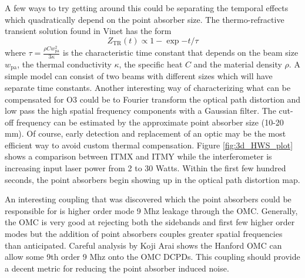 	A few ways to try getting around this could be separating the temporal effects which quadratically depend on the point absorber size. The thermo-refractive transient solution found in Vinet \cite{Vinet_Thermal_Issues} has the form
	\begin{equation}\label{Thermal_Dist_time}
	Z_{\text{TR}}(t)   \propto 1-\exp{-t/ \tau}
	\end{equation}
	where $\tau = \frac{\rho C w_\text{pa}^2}{3 \kappa} $ is the characteristic time constant that depends on the beam size $w_\text{pa}$, the thermal conductivity $\kappa$, the specific heat $C$ and the material density $\rho$.  A simple model can consist of two beams with different sizes which will have separate time constants.  Another interesting way of characterizing what can be compensated for O3 could be to Fourier transform the optical path distortion and low pass the high spatial frequency components with a Gaussian filter. The cut-off frequency can be estimated by the approximate point absorber size (10-20 mm).  Of course, early detection and replacement of an optic may be the most efficient way to avoid custom thermal compensation.  Figure \ref{fig:3d_HWS_plot} shows a comparison between ITMX and ITMY while the interferometer is increasing input laser power from 2 to 30 Watts.  Within the first few hundred seconds, the point absorbers begin showing up in the optical path distortion map.
	
	An interesting coupling that was discovered which the point absorbers could be responsible for is higher order mode 9 Mhz leakage through the OMC.  Generally, the OMC is very good at rejecting both the sidebands and first few higher order modes but the addition of point absorbers couples greater spatial frequencies than anticipated.  Careful analysis by Koji Arai \cite{9rin} shows the Hanford OMC can allow some 9th order 9 Mhz onto the OMC DCPDs.  This coupling should provide a decent metric for reducing the point absorber induced noise. 
	
